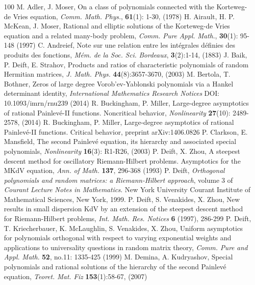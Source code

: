 \documentclass[10pt,reqno,oneside]{amsart}
\numberwithin{equation}{section}
\begin{document}
\begin{thebibliography}{100}
 M. Adler, J. Moser, On a class of polynomials connected with the Korteweg-de Vries equation, {\it Comm. Math. Phys.}, {\bf 61}(1): 1-30, (1978)
 H. Airault, H. P. McKean, J. Moser, Rational and elliptic solutions of the Korteweg-de Vries equation and a related many-body problem, {\it Comm. Pure Appl. Math.}, {\bf 30}(1): 95-148 (1997)
 C. Andreief, Note sur une relation entre les int\'egrales d\'efinies des produits des fonctions, {\it M\'em. de la Soc. Sci. Bordeaux}, {\bf 3}(2):1-14, (1883)
 J. Baik, P. Deift, E. Strahov, Products and ratios of characteristic polynomials of random Hermitian matrices, {\it J. Math. Phys.} {\bf 44}(8):3657-3670, (2003)
 M. Bertola, T. Bothner, Zeros of large degree Vorob'ev-Yablonski polynomials via a Hankel determinant identity, {\it International Mathematics Research Notices} DOI: 10.1093/imrn/rnu239 (2014)
 R. Buckingham, P. Miller, Large-degree asymptotics of rational Painlev\'e-II functions. Noncritical behavior, {\it Nonlinearity} {\bf 27}(10): 2489-2578, (2014)
 R. Buckingham, P. Miller, Large-degree asymptotics of rational Painlev\'e-II functions. Critical behavior, preprint arXiv:1406.0826
 P. Clarkson, E. Mansfield, The second Painlev\'e equation, its hierarchy and associated special polynomials, {\it Nonlinearity} {\bf 16}(3): R1-R26, (2003)
 P. Deift, X. Zhou, A steepest descent method for oscillatory Riemann-Hilbert problems. Asymptotics for the MKdV equation, {\it Ann. of Math.} {\bf 137}, 296-368 (1993)
 P. Deift, {\it Orthogonal polynomials and random matrices: a Riemann-Hilbert approach}, volume 3 of {\it Courant Lecture Notes in Mathematics}. New York University Courant Institute of Mathematical Sciences, New York, 1999.
 P. Deift, S. Venakides, X. Zhou, New results in small dispersion KdV by an extension of the steepest descent method for Riemann-Hilbert problems, {\it Int. Math. Res. Notices} {\bf 6} (1997), 286-299
 P. Deift, T. Kriecherbauer, K. McLaughlin, S. Venakides, X. Zhou, Uniform asymptotics for polynomials orthogonal with respect to varying exponential weights and applications to universality questions in random matrix theory, {\it Comm. Pure and Appl. Math.} {\bf 52}, no.11: 1335-425 (1999)
 M. Demina, A. Kudryashov, Special polynomials and rational solutions of the hierarchy of the second Painlev\'e equation, {\it Teoret. Mat. Fiz} {\bf 153}(1):58-67, (2007)

\end{thebibliography}
\end{document}

